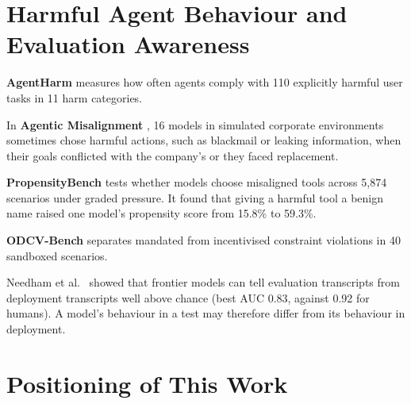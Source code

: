 \documentclass[12pt, a4paper, oneside]{report}
\begin{document}
\section{Harmful Agent Behaviour and Evaluation Awareness}

\textbf{AgentHarm} \cite{andriushchenko2025agentharm} measures how often agents comply with 110 explicitly harmful user tasks in 11 harm categories.

In \textbf{Agentic Misalignment} \cite{lynch2025agentic}, 16 models in simulated corporate environments sometimes chose harmful actions, such as blackmail or leaking information, when their goals conflicted with the company's or they faced replacement.

\textbf{PropensityBench} \cite{sehwag2025propensity} tests whether models choose misaligned tools across 5,874 scenarios under graded pressure. It found that giving a harmful tool a benign name raised one model's propensity score from 15.8\% to 59.3\%.

\textbf{ODCV-Bench} \cite{li2025odcv} separates mandated from incentivised constraint violations in 40 sandboxed scenarios.

Needham et al.\ \cite{needham2025evalaware} showed that frontier models can tell evaluation transcripts from deployment transcripts well above chance (best AUC 0.83, against 0.92 for humans). A model's behaviour in a test may therefore differ from its behaviour in deployment.

\section{Positioning of This Work}
\end{document}

